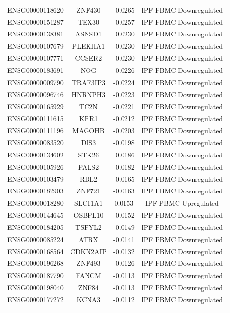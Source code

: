 \documentclass[
]{article}
\begin{document}
\begin{singlespace}
\begin{longtable}[t]{lccc}
ENSG00000118620 & ZNF430 & -0.0265 & IPF PBMC Downregulated\\
ENSG00000151287 & TEX30 & -0.0257 & IPF PBMC Downregulated\\
ENSG00000138381 & ASNSD1 & -0.0230 & IPF PBMC Downregulated\\
ENSG00000107679 & PLEKHA1 & -0.0230 & IPF PBMC Downregulated\\
ENSG00000107771 & CCSER2 & -0.0230 & IPF PBMC Downregulated\\
\addlinespace
ENSG00000183691 & NOG & -0.0226 & IPF PBMC Downregulated\\
ENSG00000009790 & TRAF3IP3 & -0.0224 & IPF PBMC Downregulated\\
ENSG00000096746 & HNRNPH3 & -0.0223 & IPF PBMC Downregulated\\
ENSG00000165929 & TC2N & -0.0221 & IPF PBMC Downregulated\\
ENSG00000111615 & KRR1 & -0.0212 & IPF PBMC Downregulated\\
\addlinespace
ENSG00000111196 & MAGOHB & -0.0203 & IPF PBMC Downregulated\\
ENSG00000083520 & DIS3 & -0.0198 & IPF PBMC Downregulated\\
ENSG00000134602 & STK26 & -0.0186 & IPF PBMC Downregulated\\
ENSG00000105926 & PALS2 & -0.0182 & IPF PBMC Downregulated\\
ENSG00000103479 & RBL2 & -0.0165 & IPF PBMC Downregulated\\
\addlinespace
ENSG00000182903 & ZNF721 & -0.0163 & IPF PBMC Downregulated\\
ENSG00000018280 & SLC11A1 & 0.0153 & IPF PBMC Upregulated\\
ENSG00000144645 & OSBPL10 & -0.0152 & IPF PBMC Downregulated\\
ENSG00000184205 & TSPYL2 & -0.0149 & IPF PBMC Downregulated\\
ENSG00000085224 & ATRX & -0.0141 & IPF PBMC Downregulated\\
\addlinespace
ENSG00000168564 & CDKN2AIP & -0.0132 & IPF PBMC Downregulated\\
ENSG00000196268 & ZNF493 & -0.0126 & IPF PBMC Downregulated\\
ENSG00000187790 & FANCM & -0.0113 & IPF PBMC Downregulated\\
ENSG00000198040 & ZNF84 & -0.0113 & IPF PBMC Downregulated\\
ENSG00000177272 & KCNA3 & -0.0112 & IPF PBMC Downregulated\\
\addlinespace

\end{longtable}
\end{singlespace}
\end{document}
